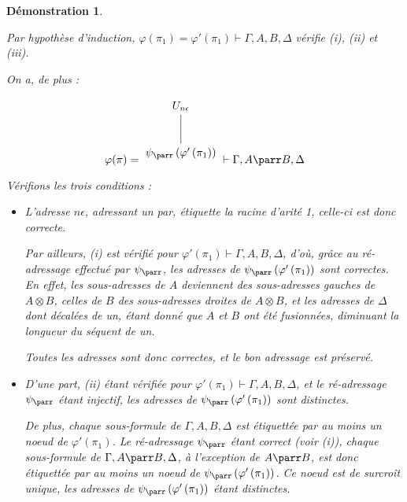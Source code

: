\documentclass[11pt,a4paper]{article}
\newtheorem{demonstration}{Démonstration}
\newcommand*{\tensor}{\otimes}
\newcommand*{\someproof}{\pi}
\newcommand*{\encode}{\ensuremath{\varphi}}
\begin{document}
\begin{demonstration}
\begin{itemize}
    Par hypothèse d'induction, $\encode \left( \pi_1 \right) = \encode ' \left( \pi_1 \right) \vdash \Gamma, A, B, \Delta$ vérifie (i), (ii) et (iii).
    
    On a, de plus :

    \begin{equation*}
    \encode ( \someproof ) = \begin{tikzpicture}%
    [level distance=1.5cm,
    level 2/.style={sibling distance=3.5cm}]
    \node {$U_{n \epsilon}$}
        child {node {$\psi_\parr \left( \encode' \left( \pi_1 \right) \right)$}
    };
    \end{tikzpicture} \vdash \Gamma, A \parr B, \Delta
    \end{equation*}

    Vérifions les trois conditions :
    \begin{itemize}
        \item[(i) :]{L'adresse $n \epsilon$, adressant un par, étiquette la racine d'arité 1, celle-ci est donc correcte.
        
        Par ailleurs, (i) est vérifié pour $\encode ' \left( \pi_1 \right) \vdash \Gamma, A, B, \Delta$, d'où, grâce au ré-adressage effectué par $\psi_\parr$, les adresses de $\psi_\parr \left( \encode' \left( \pi_1 \right) \right)$ sont correctes. En effet, les sous-adresses de $A$ deviennent des sous-adresses gauches de $A \tensor B$, celles de $B$ des sous-adresses droites de $A \tensor B$, et les adresses de $\Delta$ dont décalées de un, étant donné que $A$ et $B$ ont été fusionnées, diminuant la longueur du séquent de un.
        
        Toutes les adresses sont donc correctes, et le bon adressage est préservé.
        }
        
        \item[(ii) :] D'une part, (ii) étant vérifiée pour $\encode ' \left( \pi_1 \right) \vdash \Gamma, A, B, \Delta$, et le ré-adressage $\psi_\parr$ étant injectif, les adresses de $\psi_\parr \left( \encode' \left( \pi_1 \right) \right)$ sont distinctes.
        
        De plus, chaque sous-formule de $\Gamma, A, B, \Delta$ est étiquettée par au moins un noeud de $\encode ' \left( \pi_1 \right)$. Le ré-adressage $\psi_\parr$ étant correct (voir (i)), chaque sous-formule de $\Gamma, A \parr B, \Delta$, à l'exception de $A \parr B$, est donc étiquettée par au moins un noeud de $\psi_\parr \left( \encode' \left( \pi_1 \right) \right)$. Ce noeud est de surcroît unique, les adresses de $\psi_\parr \left( \encode' \left( \pi_1 \right) \right)$ étant distinctes.
        

\end{itemize}
\end{itemize}
\end{demonstration}
\end{document}
